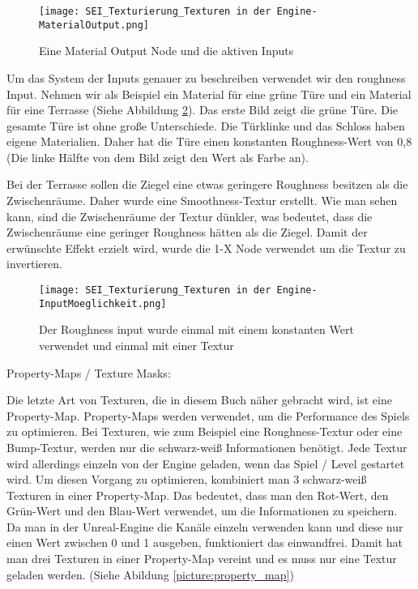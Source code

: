 \begin{figure}[h]
    \centering
    \texttt{[image: SEI\_Texturierung\_Texturen in der Engine-MaterialOutput.png]}
    \caption{Eine Material Output Node und die aktiven Inputs}
    \label{picture:mat_ue4_node}
\end{figure}


Um das System der Inputs genauer zu beschreiben verwendet wir den roughness Input. Nehmen wir als Beispiel ein Material
für eine grüne Türe und ein Material für eine Terrasse (Siehe Abbildung \ref{picture:tex_mat_roughness}).
Das erste Bild zeigt die grüne Türe. Die gesamte Türe ist ohne große Unterschiede. Die Türklinke und das Schloss haben
eigene Materialien. Daher hat die Türe einen konstanten Roughness-Wert von 0,8 (Die linke Hälfte von dem Bild zeigt
den Wert als Farbe an).

Bei der Terrasse sollen die Ziegel eine etwas geringere Roughness besitzen als die Zwischenräume. Daher wurde eine
Smoothness-Textur erstellt. Wie man sehen kann, sind die Zwischenräume der Textur dünkler, was bedeutet, dass die
Zwischenräume eine geringer Roughness hätten als die Ziegel. Damit der erwünschte Effekt erzielt wird, wurde die
1-X Node verwendet um die Textur zu invertieren.

\begin{figure}[h]
    \centering
    \texttt{[image: SEI\_Texturierung\_Texturen in der Engine-InputMoeglichkeit.png]}
    \caption{Der Roughness input wurde einmal mit einem konstanten Wert verwendet und einmal mit einer Textur}
    \label{picture:tex_mat_roughness}
\end{figure}


Property-Maps / Texture Masks\citep{ue:tex_property_map}:

Die letzte Art von Texturen, die in diesem Buch näher gebracht wird, ist eine Property-Map. Property-Maps werden
verwendet, um die Performance des Spiels zu optimieren. Bei Texturen, wie zum Beispiel eine Roughness-Textur oder eine
Bump-Textur, werden nur die schwarz-weiß Informationen benötigt. Jede Textur wird allerdings einzeln von der Engine
geladen, wenn das Spiel / Level gestartet wird. Um diesen Vorgang zu optimieren, kombiniert man 3 schwarz-weiß Texturen
in einer Property-Map. Das bedeutet, dass man den Rot-Wert, den Grün-Wert und den Blau-Wert verwendet, um die
Informationen zu speichern. Da man in der Unreal-Engine die Kanäle einzeln verwenden kann und diese nur einen Wert
zwischen 0 und 1 ausgeben, funktioniert das einwandfrei. Damit hat man drei Texturen in einer
Property-Map vereint und es muss nur eine Textur geladen werden. (Siehe Abildung \ref{picture:property_map})

